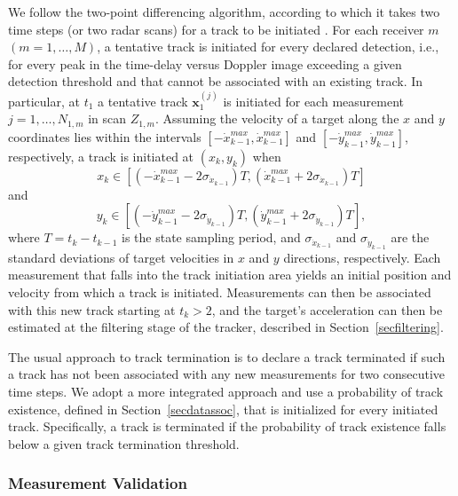 \documentclass[times]{asjcauth}
\begin{document}
We follow the two-point differencing algorithm, according to which it takes two time steps (or two radar scans) for a track to be initiated \cite{Barbook}. For each receiver $m$ $(m = 1,\ldots,M)$, a tentative track is initiated for every declared detection, i.e., for every peak in the time-delay versus Doppler image exceeding a given detection threshold and that cannot be associated with an existing track. In particular, at $t_{1}$ a tentative track $\mathbf{x}_{1}^{(j)}$ is initiated for each measurement $j = 1,\ldots, N_{1,m}$ in scan $Z_{1,m}$. Assuming the velocity of a target along the $x$ and $y$ coordinates lies within the intervals $\left[-\dot{x}_{k-1}^{max},\dot{x}_{k-1}^{max}\right]$ and $\left[-\dot{y}_{k-1}^{max},\dot{y}_{k-1}^{max}\right]$, respectively, a track is initiated at $\left(x_{k},y_{k}\right)$ when
\begin{equation*}
x_{k}\in\left[\left(-\dot{x}_{k-1}^{max}-2\sigma_{\dot{x}_{k-1}}\right)T,\left(\dot{x}_{k-1}^{max}+2\sigma_{\dot{x}_{k-1}}\right)T\right]
\end{equation*}
\noindent and
\begin{equation*}
y_{k}\in\left[\left(-\dot{y}_{k-1}^{max}-2\sigma_{\dot{y}_{k-1}}\right)T,\left(\dot{y}_{k-1}^{max}+2\sigma_{\dot{y}_{k-1}}\right)T\right],
\end{equation*}
\noindent where $T=t_{k}-t_{k-1}$ is the state sampling period, and $\sigma_{\dot{x}_{k-1}}$ and $\sigma_{\dot{y}_{k-1}}$ are the standard deviations of target velocities in $x$ and $y$ directions, respectively. Each measurement that falls into the track initiation area yields an initial position and velocity from which a track is initiated. Measurements can then be associated with this new track starting at $t_{k}>2$, and the target's acceleration can then be estimated at the filtering stage of the tracker, described in Section~\ref{secfiltering}.

The usual approach to track termination is to declare a track terminated if such a track has not been associated with any new measurements for two consecutive time steps. We adopt a more integrated approach and use a probability of track existence, defined in Section~\ref{secdatassoc}, that is initialized for every initiated track. Specifically, a track is terminated if the probability of track existence falls below a given track termination threshold.

\subsubsection{Measurement Validation}
\end{document}
